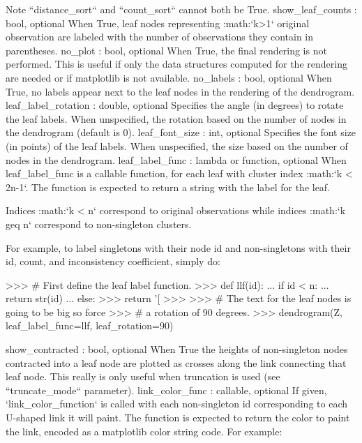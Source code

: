 \begin{DoxyVerb}
    Note ``distance_sort`` and ``count_sort`` cannot both be True.
show_leaf_counts : bool, optional
     When True, leaf nodes representing :math:`k>1` original
     observation are labeled with the number of observations they
     contain in parentheses.
no_plot : bool, optional
    When True, the final rendering is not performed. This is
    useful if only the data structures computed for the rendering
    are needed or if matplotlib is not available.
no_labels : bool, optional
    When True, no labels appear next to the leaf nodes in the
    rendering of the dendrogram.
leaf_label_rotation : double, optional
    Specifies the angle (in degrees) to rotate the leaf
    labels. When unspecified, the rotation based on the number of
    nodes in the dendrogram (default is 0).
leaf_font_size : int, optional
    Specifies the font size (in points) of the leaf labels. When
    unspecified, the size based on the number of nodes in the
    dendrogram.
leaf_label_func : lambda or function, optional
    When leaf_label_func is a callable function, for each
    leaf with cluster index :math:`k < 2n-1`. The function
    is expected to return a string with the label for the
    leaf.

    Indices :math:`k < n` correspond to original observations
    while indices :math:`k \\geq n` correspond to non-singleton
    clusters.

    For example, to label singletons with their node id and
    non-singletons with their id, count, and inconsistency
    coefficient, simply do:

    >>> # First define the leaf label function.
    >>> def llf(id):
    ...       if id < n:
    ...           return str(id)
    ...       else:
    >>>           return '[%
    >>>
    >>>  # The text for the leaf nodes is going to be big so force
    >>>  # a rotation of 90 degrees.
    >>>  dendrogram(Z, leaf_label_func=llf, leaf_rotation=90)

show_contracted : bool, optional
    When True the heights of non-singleton nodes contracted
    into a leaf node are plotted as crosses along the link
    connecting that leaf node.  This really is only useful when
    truncation is used (see ``truncate_mode`` parameter).
link_color_func : callable, optional
    If given, `link_color_function` is called with each non-singleton id
    corresponding to each U-shaped link it will paint. The function is
    expected to return the color to paint the link, encoded as a matplotlib
    color string code. For example:


\end{DoxyVerb}

